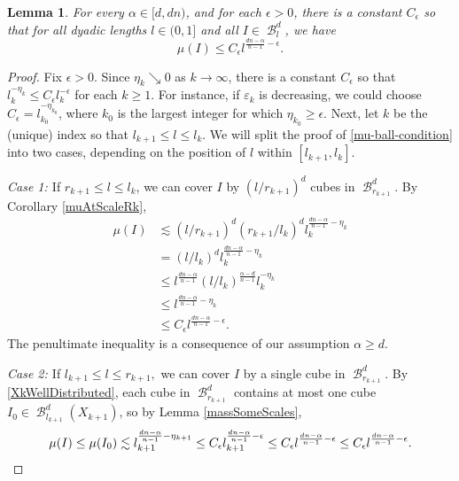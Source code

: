 \documentclass[dvipsnames,letterpaper,12pt]{article}
\numberwithin{equation}{section}
\theoremstyle{plain}
\newtheorem{lemma}{Lemma}
\theoremstyle{remark}
\DeclareMathOperator{\B}{\mathcal{B}}
\begin{document}
\begin{lemma} \label{frostmanBound}
For every $\alpha \in [d, dn)$, and for each $\epsilon>0$, there is a constant $C_\epsilon$ so that for all dyadic lengths $l\in (0,1]$ and all $I \in \B_l^d$, we have
	\begin{equation} 
	\mu(I) \leq C_{\epsilon} l^{\frac{dn - \alpha}{n - 1} - \epsilon}. \label{mu-ball-condition} 
	\end{equation} 
\end{lemma}
\begin{proof}
	Fix $\epsilon > 0$. Since $\eta_k \searrow 0$ as $k\to\infty$, there is a constant $C_{\epsilon}$ so that $l_k^{-\eta_k}\leq C_{\epsilon}l_k^{-\epsilon}$ for each $k \geq 1$. For instance, if $\varepsilon_k$ is decreasing, we could choose $C_{\epsilon}=l_{k_0}^{-\eta_{k_0}}$, where $k_0$ is the largest integer for which $\eta_{k_0} \geq \epsilon$. Next, let $k$ be the (unique) index so that $l_{k+1}\leq l\leq l_{k}$. We will split the proof of \eqref{mu-ball-condition} into two cases, depending on the position of  $l$ within $[l_{k+1}, l_k]$. 

	{\em{Case 1: }} If $r_{k+1} \leq l \leq l_k$, 
	we can cover $I$ by $(l/r_{k+1})^d$ cubes in $\B^d_{r_{k+1}}$. By Corollary \ref{muAtScaleRk},
	\begin{equation}
	\begin{split}
	\mu(I) & \lesssim (l/r_{k+1})^d (r_{k+1}/l_k)^d l_k^{\frac{dn-\alpha}{n-1}-\eta_k} \\
	& =(l/l_k)^d l_k^{\frac{dn-\alpha}{n-1}-\eta_{k}}\\
	& \leq l^{\frac{dn-\alpha}{n-1}} (l/l_k)^{\frac{\alpha - d}{n-1}} l_k^{-\eta_k}\\
	& \leq l^{\frac{dn-\alpha}{n-1} - \eta_k}  \\
	& \leq C_{\epsilon}l^{\frac{dn-\alpha}{n-1}-\epsilon}.
	\end{split}
	\end{equation}
The penultimate inequality is a consequence of our assumption $\alpha \geq d$. 

	{\em{Case 2: }} If $l_{k+1} \leq l \leq r_{k+1},$ we can cover $I$ by a single cube in $\B^d_{r_{k+1}}$. By \eqref{XkWellDistributed}, each cube in $\B^d_{r_{k+1}}$ contains at most one cube $I_0 \in \B^d_{l_{k+1}}(X_{k+1})$, so by Lemma \ref{massSomeScales},
	\[ 
		\mu(I) \leq \mu(I_0) \lesssim l_{k+1}^{\frac{dn - \alpha}{n - 1} - \eta_{k+1}} 
		\leq C_{\epsilon}l_{k+1}^{\frac{dn - \alpha}{n - 1} - \epsilon}
		\leq C_{\epsilon}l^{\frac{dn - \alpha}{n - 1} - \epsilon} \leq C_{\epsilon}l^{\frac{dn - \alpha}{n - 1} - \epsilon }.\qedhere
	\]


\end{proof}
\end{document}

